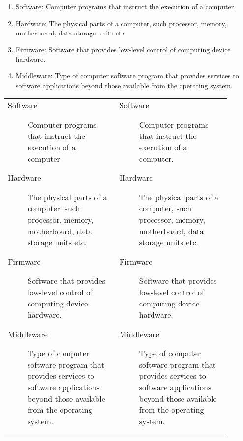\documentclass[a4paper, 11pt]{article}
\begin{document}
\begin{tcblisting}{}
    \begin{enumerate}
        \item Software: Computer programs that instruct the execution of a computer.
        \item Hardware: The physical parts of a computer, such processor, memory, motherboard, data storage units etc.
        \item Firmware: Software that provides low-level control of computing device hardware.
        \item Middleware: Type of computer software program that provides services to software applications beyond those available from the operating system.
    \end{enumerate}
\end{tcblisting}

\begin{tcblisting}{}
    \begin{tabular}{p{0.45\linewidth}p{0.45\linewidth}}
        \begin{description}
            \item[Software] Computer programs that instruct the execution of a computer.
            \item[Hardware] The physical parts of a computer, such processor, memory, motherboard, data storage units etc.
            \item[Firmware] Software that provides low-level control of computing device hardware.
            \item[Middleware] Type of computer software program that provides services to software applications beyond those available from the operating system.
        \end{description}
        &
        \PLTUseResource{sliced-citrus}
        \PLTUsePalette{sliced-citrus}
        \begin{description}
            \item[Software] Computer programs that instruct the execution of a computer.
            \item[Hardware] The physical parts of a computer, such processor, memory, motherboard, data storage units etc.
            \item[Firmware] Software that provides low-level control of computing device hardware.
            \item[Middleware] Type of computer software program that provides services to software applications beyond those available from the operating system.
        \end{description}
    \end{tabular}
\end{tcblisting}
\end{document}
